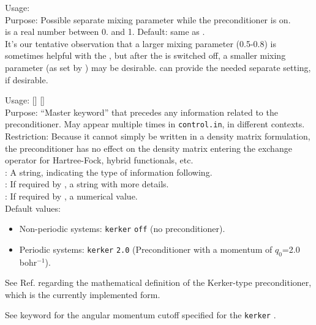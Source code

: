 {
  \noindent
  Usage:   \\[1.0ex]
  Purpose: Possible separate mixing parameter while the preconditioner
  is on. \\[1.0ex] 
   is a real number between 0. and 1. Default: same as
  . \\ 
}
It's our tentative observation that a larger mixing parameter (0.5-0.8)
is sometimes helpful with the , but after the
 is switched off, a smaller mixing parameter
(as set by ) may be
desirable.  can provide the needed separate
setting, if desirable.

{
  \noindent
  Usage:   []
    [] \\[1.0ex]
  Purpose: ``Master keyword'' that precedes any information related to
    the preconditioner. May appear multiple times in
    \texttt{control.in}, in different contexts. \\[1.0ex]
  Restriction: Because it cannot simply be written in a density matrix
    formulation, the preconditioner has no effect on the density matrix
    entering the exchange operator for Hartree-Fock, hybrid
    functionals, etc. \\[1.0ex]
   : A string, indicating the type of information
    following. \\
   : If required by , a string with more
    details. \\
   : If required by , a numerical value. \\
}
Default values: 
\begin{itemize}
  \item Non-periodic systems:  \texttt{kerker}
    \texttt{off} (no preconditioner). 
  \item Periodic systems:  \texttt{kerker}
    \texttt{2.0} (Preconditioner with a momentum of $q_0$=2.0
     bohr$^{-1}$).  
\end{itemize}
See Ref. \cite{Blum08} regarding the mathematical
definition of the Kerker-type \cite{Manninen75,Nieminen77,Kerker81}
preconditioner, which is the currently implemented form.

See keyword  for the angular momentum
cutoff specified for the \texttt{kerker} .

